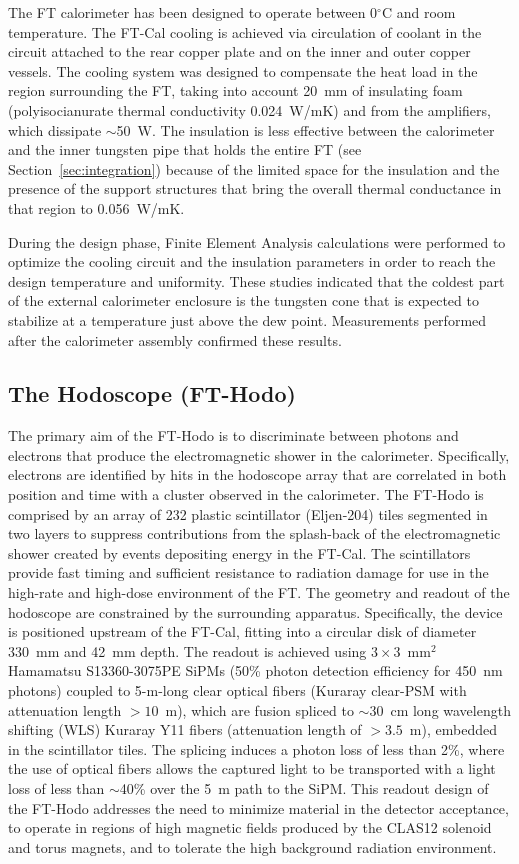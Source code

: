 The FT calorimeter has been designed to operate between 0$^\circ$C and room temperature. The FT-Cal cooling is
achieved via circulation of coolant in the circuit attached to the rear copper plate and on the inner and outer copper
vessels. The cooling system was designed to compensate the heat load in the region surrounding the FT, taking into
account 20~mm of insulating foam (polyisocianurate thermal conductivity 0.024~W/mK) and from the amplifiers, which
dissipate $\sim$50~W. The insulation is less effective between the calorimeter and the inner tungsten pipe that
holds the entire FT (see Section~\ref{sec:integration}) because of the limited space for the insulation and the
presence of the support structures that bring the overall thermal conductance in that region to 0.056~W/mK.

During the design phase, Finite Element Analysis calculations were performed to optimize the cooling circuit and the
insulation parameters in order to reach the design temperature and uniformity. These studies indicated that the
coldest part of the external calorimeter enclosure is the tungsten cone that is expected to stabilize at a temperature
just above the dew point. Measurements performed after the calorimeter assembly confirmed these results.

\subsection{The Hodoscope (FT-Hodo)}

The primary aim of the FT-Hodo is to discriminate between photons and electrons that produce the electromagnetic
shower in the calorimeter. Specifically, electrons are identified by hits in the hodoscope array that are correlated
in both position and time with a cluster observed in the calorimeter. The FT-Hodo is comprised by an array of 232 plastic
scintillator (Eljen-204) tiles segmented in two layers to suppress contributions from the splash-back of the
electromagnetic shower created by events depositing energy in the FT-Cal. The scintillators provide fast timing and
sufficient resistance to radiation damage for use in the high-rate and high-dose environment of the FT. The geometry
and readout of the hodoscope are constrained by the surrounding apparatus. Specifically, the device is positioned
upstream of the FT-Cal, fitting into a circular disk of diameter 330~mm and 42~mm depth. The readout is achieved
using $3 \times 3$~mm$^2$ Hamamatsu S13360-3075PE SiPMs (50\% photon detection efficiency for 450~nm
photons) coupled to 5-m-long clear optical fibers (Kuraray clear-PSM with attenuation length $>10$~m), which are
fusion spliced to $\sim$30~cm long wavelength shifting (WLS) Kuraray Y11 fibers (attenuation length of $> 3.5$~m),
embedded in the scintillator tiles. The splicing induces a photon loss of less than 2\%, where the use of optical fibers
allows the captured light to be transported with a light loss of less than $\sim$40\% over the 5~m path to the SiPM.
This readout design of the FT-Hodo addresses the need to minimize material in the detector acceptance, to operate
in regions of high magnetic fields produced by the CLAS12 solenoid and torus magnets, and to tolerate the high
background radiation environment. 

